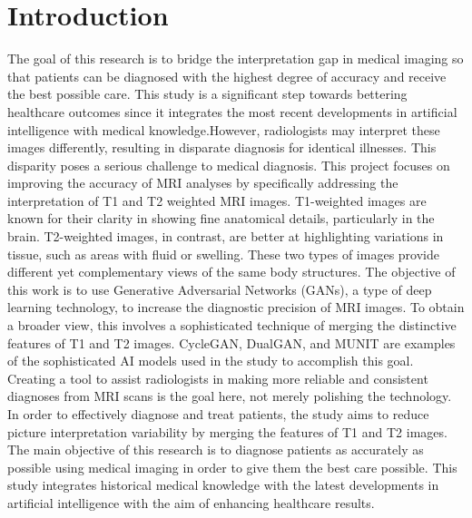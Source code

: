 \documentclass[conference]{IEEEtran}
\begin{document}
\section{Introduction}
The goal of this research is to bridge the interpretation gap in medical imaging so that patients can be diagnosed with the highest degree of accuracy and receive the best possible care. This study is a significant step towards bettering healthcare outcomes since it integrates the most recent developments in artificial intelligence with medical knowledge.However, radiologists may interpret these images differently, resulting in disparate diagnosis for identical illnesses. This disparity poses a serious challenge to medical diagnosis.
This project focuses on improving the accuracy of MRI analyses by specifically addressing the interpretation of T1 and T2 weighted MRI images. T1-weighted images are known for their clarity in showing fine anatomical details, particularly in the brain. T2-weighted images, in contrast, are better at highlighting variations in tissue, such as areas with fluid or swelling. These two types of images provide different yet complementary views of the same body structures.
The objective of this work is to use Generative Adversarial Networks (GANs), a type of deep learning technology, to increase the diagnostic precision of MRI images. To obtain a broader view, this involves a sophisticated technique of merging the distinctive features of T1 and T2 images. CycleGAN, DualGAN, and MUNIT are examples of the sophisticated AI models used in the study to accomplish this goal.
Creating a tool to assist radiologists in making more reliable and consistent diagnoses from MRI scans is the goal here, not merely polishing the technology. In order to effectively diagnose and treat patients, the study aims to reduce picture interpretation variability by merging the features of T1 and T2 images.
The main objective of this research is to diagnose patients as accurately as possible using medical imaging in order to give them the best care possible. This study integrates historical medical knowledge with the latest developments in artificial intelligence with the aim of enhancing healthcare results.
\end{document}
